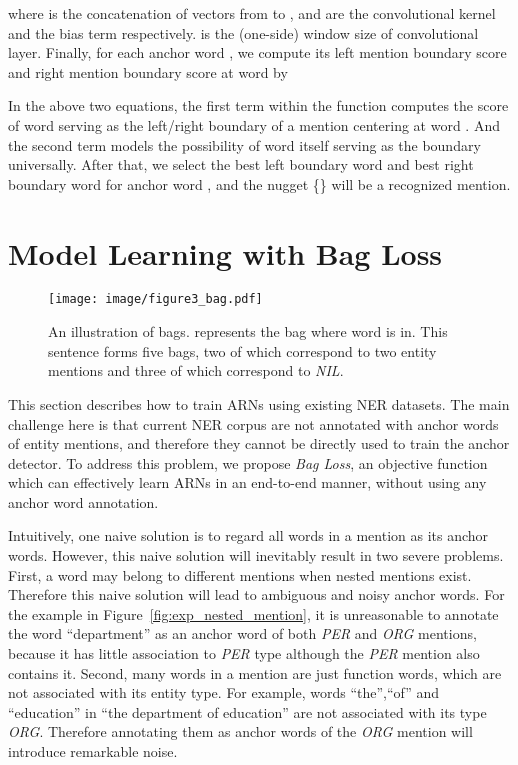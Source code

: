 \documentclass[11pt,a4paper]{article}
\begin{document}
\begin{small}

\end{small}where  is the concatenation of vectors from  to ,  and  are the convolutional kernel and the bias term respectively.  is the (one-side) window size of convolutional layer. Finally, for each anchor word , we compute its left mention boundary score  and right mention boundary score  at word  by

\begin{small}

\end{small}In the above two equations, the first term within the  function computes the score of word  serving as the left/right boundary of a mention centering at word . And the second term models the possibility of word  itself serving as the boundary universally.
After that, we select the best left boundary word  and best right boundary word  for anchor word , and the nugget \{\} will be a recognized mention.




\section{Model Learning with Bag Loss}


\begin{figure*}
  \centering
  \setlength{\belowcaptionskip}{-0.4cm}
  \texttt{[image: image/figure3\_bag.pdf]}\\
  \caption{An illustration of bags.  represents the bag where word  is in. This sentence forms five bags, two of which correspond to two entity mentions and three of which correspond to \emph{NIL}.}
  \label{fig:bags}
\end{figure*}

This section describes how to train ARNs using existing NER datasets. The main challenge here is that current NER corpus are not annotated with anchor words of entity mentions, and therefore they cannot be directly used to train the anchor detector. To address this problem, we propose \emph{Bag Loss}, an objective function which can effectively learn ARNs in an end-to-end manner, without using any anchor word annotation.

Intuitively, one naive solution is to regard all words in a mention as its anchor words. However, this naive solution will inevitably result in two severe problems. First, a word may belong to different mentions when nested mentions exist. Therefore this naive solution will lead to ambiguous and noisy anchor words. For the example in Figure~\ref{fig:exp_nested_mention}, it is unreasonable to annotate the word ``department'' as an anchor word of both \emph{PER} and \emph{ORG} mentions, because it has little association to \emph{PER} type although the \emph{PER} mention also contains it. Second, many words in a mention are just function words, which are not associated with its entity type. For example, words ``the'',``of'' and ``education'' in ``the department of education'' are not associated with its type \emph{ORG}. Therefore annotating them as anchor words of the \emph{ORG} mention will introduce remarkable noise.
\end{document}
